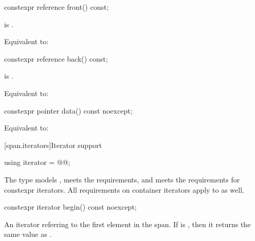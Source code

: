 %
\begin{itemdecl}
constexpr reference front() const;
\end{itemdecl}

\begin{itemdescr}
\pnum
\expects
{} is .

\pnum
\effects
Equivalent to: 
\end{itemdescr}

%
\begin{itemdecl}
constexpr reference back() const;
\end{itemdecl}

\begin{itemdescr}
\pnum
\expects
{} is .

\pnum
\effects
Equivalent to: 
\end{itemdescr}

%
\begin{itemdecl}
constexpr pointer data() const noexcept;
\end{itemdecl}

\begin{itemdescr}
\pnum
\effects
Equivalent to: 
\end{itemdescr}

[span.iterators]{Iterator support}

%
\begin{itemdecl}
using iterator = @@;
\end{itemdecl}

\begin{itemdescr}
\pnum
The type
models ,
meets the 
requirements,
and
meets the requirements for
constexpr iterators.
All requirements on container iterators apply to
 as well.
\end{itemdescr}

%
\begin{itemdecl}
constexpr iterator begin() const noexcept;
\end{itemdecl}

\begin{itemdescr}
\pnum
\returns
An iterator referring to the first element in the span.
If  is , then it returns the
same value as .
\end{itemdescr}

